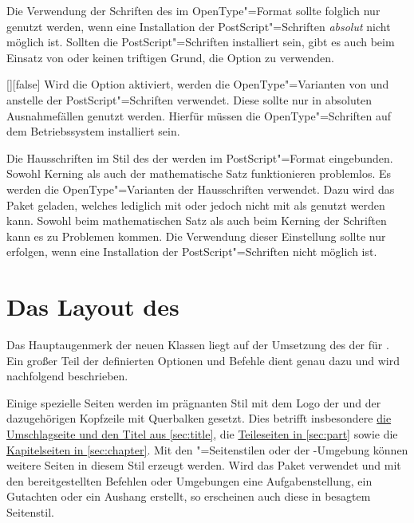 Die Verwendung der Schriften des \CDs im OpenType"=Format sollte folglich nur 
genutzt werden, wenn eine Installation der PostScript"=Schriften \emph{absolut} 
nicht möglich ist. Sollten die PostScript"=Schriften installiert sein, gibt es 
auch beim Einsatz von  oder  keinen triftigen 
Grund, die Option  zu verwenden.

\begin{Declaration}[v2.02]{[\PBoolean]}[false]%
\printdeclarationlist%
%
Wird die Option aktiviert, werden die OpenType"=Varianten von \Univers und \DIN 
anstelle der PostScript"=Schriften verwendet. Diese sollte nur in absoluten
Ausnahmefällen genutzt werden. Hierfür müssen die OpenType"=Schriften auf dem 
Betriebssystem installiert sein.
\begin{values}
\itemfalse*
  Die Hausschriften im Stil des \CDs der \TnUD werden im PostScript"=Format 
  eingebunden. Sowohl Kerning als auch der mathematische Satz funktionieren 
  problemlos.
\itemtrue*
   Es werden die OpenType"=Varianten der Hausschriften verwendet. Dazu wird das 
   Paket  geladen, welches lediglich mit  
   oder  jedoch nicht mit  als genutzt werden 
   kann. Sowohl beim mathematischen Satz als auch beim Kerning der Schriften 
   kann es zu Problemen kommen. Die Verwendung dieser Einstellung sollte nur 
   erfolgen, wenn eine Installation der PostScript"=Schriften nicht möglich ist.
\end{values}
\end{Declaration}


\section{Das Layout des \CDs}
Das Hauptaugenmerk der neuen Klassen liegt auf der Umsetzung des \CDs der
\TnUD für . Ein großer Teil der definierten Optionen und Befehle
dient genau dazu und wird nachfolgend beschrieben.

Einige spezielle Seiten werden im prägnanten Stil mit dem Logo der \TnUD und 
der dazugehörigen Kopfzeile mit Querbalken gesetzt. Dies betrifft insbesondere 
\hyperref[sec:title]{die Umschlagseite und den Titel aus \autoref{sec:title}}, 
die \hyperref[sec:part]{Teileseiten in \autoref{sec:part}} sowie die
\hyperref[sec:chapter]{Kapitelseiten in \autoref{sec:chapter}}. Mit den 
"=Seitenstilen oder der -Umgebung  
können weitere Seiten in diesem Stil erzeugt werden. Wird das Paket 
 verwendet und mit den bereitgestellten Befehlen oder 
Umgebungen eine Aufgabenstellung, ein Gutachten oder ein Aushang erstellt, so 
erscheinen auch diese in besagtem Seitenstil.


